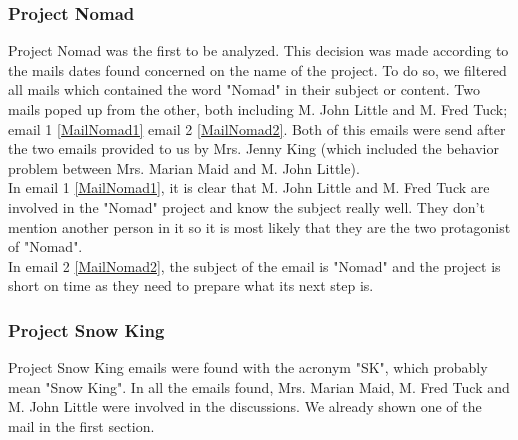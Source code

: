 \subsubsection{Project Nomad}
Project Nomad was the first to be analyzed. This decision was made according to the mails dates found concerned on the name of the project. To do so, we filtered all mails which contained the word "Nomad" in their subject or content. Two mails poped up from the other, both including M. John Little and M. Fred Tuck; email 1 \ref{MailNomad1} email 2 \ref{MailNomad2}. Both of this emails were send after the two emails provided to us by Mrs. Jenny King (which included the behavior problem between Mrs. Marian Maid and M. John Little).\\
In email 1 \ref{MailNomad1}, it is clear that M. John Little and M. Fred Tuck are involved in the "Nomad" project and know the subject really well. They don't mention another person in it so it is most likely that they are the two protagonist of "Nomad".\\
In email 2 \ref{MailNomad2}, the subject of the email is "Nomad" and the project is short on time as they need to prepare what its next step is.

\subsubsection{Project Snow King}
Project Snow King emails were found with the acronym "SK", which probably mean "Snow King". In all the emails found, Mrs. Marian Maid, M. Fred Tuck and M. John Little were involved in the discussions. We already shown one of the mail in the first section.